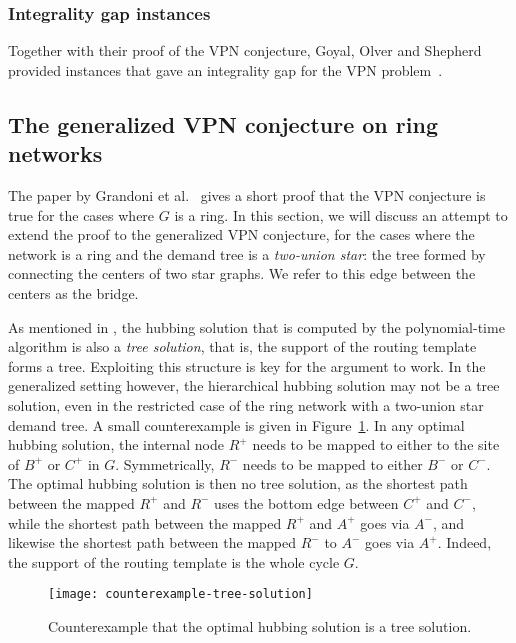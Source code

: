 \subsubsection{Integrality gap instances}
Together with their proof of the VPN conjecture, Goyal, Olver and Shepherd provided instances that gave an integrality gap for the VPN problem~\cite{goyal2013vpn}.

\subsection{The generalized VPN conjecture on ring networks} \label{subsec:genvpn:rings}
The paper by Grandoni et al.~\cite{grandoni2008short} gives a short proof that the VPN conjecture is true for the cases where $G$ is a ring.
In this section, we will discuss an attempt to extend the proof to the generalized VPN conjecture, for the cases where the network is a ring and the demand tree is a \emph{two-union star}: the tree formed by connecting the centers of two star graphs.
We refer to this edge between the centers as the bridge.

As mentioned in \cite{grandoni2008short}, the hubbing solution that is computed by the polynomial-time algorithm is also a \emph{tree solution}, that is, the support of the routing template forms a tree.
Exploiting this structure is key for the argument to work.
In the generalized setting however, the hierarchical hubbing solution may not be a tree solution, even in the restricted case of the ring network with a two-union star demand tree.
A small counterexample is given in Figure~\ref{fig:counterex-tree-solution}.
In any optimal hubbing solution, the internal node $R^+$ needs to be mapped to either to the site of $B^+$ or $C^+$ in $G$.
Symmetrically, $R^-$ needs to be mapped to either $B^-$ or $C^-$.
The optimal hubbing solution is then no tree solution, as the shortest path between the mapped $R^+$ and $R^-$ uses the bottom edge between $C^+$ and $C^-$, while the shortest path between the mapped $R^+$ and $A^+$ goes via $A^-$, and likewise the shortest path between the mapped $R^-$ to $A^-$ goes via $A^+$.
Indeed, the support of the routing template is the whole cycle $G$.

\begin{figure}
    \centering
    \texttt{[image: counterexample-tree-solution]}
    \caption{Counterexample that the optimal hubbing solution is a tree solution.} \label{fig:counterex-tree-solution}
\end{figure}

